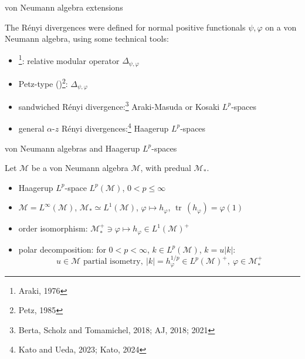 \documentclass[mathserif]{beamer}
\newcommand{\<}{\langle}
\renewcommand{\>}{\rangle}
\newcommand{\Tr}{\operatorname{tr}\,}
\newcommand{\Me}{\mathcal M}
\begin{document}
\begin{frame}{von Neumann algebra extensions}

The R\'enyi divergences were defined for normal positive functionals $\psi,\varphi$ on a
von Neumann algebra, using some technical tools:

\medskip

\begin{itemize}
\item {}\footnote{Araki, 1976}:  relative modular operator
$\Delta_{\psi,\varphi}$
\item Petz-type ()\footnote{Petz, 1985}:
$\Delta_{\psi,\varphi}$
\item sandwiched R\'enyi divergence:\footnote{Berta, Scholz and Tomamichel,
2018; AJ, 2018; 2021}
 Araki-Masuda or Kosaki $L^p$-spaces
\item general $\alpha$-$z$ R\'enyi divergences:\footnote{Kato and Ueda, 2023; Kato, 2024}
Haagerup $L^p$-spaces

 \end{itemize}


\end{frame}

\begin{frame}{von Neumann algebras and Haagerup $L^p$-spaces}


Let $\Me$ be a  von Neumann algebra $\Me$, with predual $\Me_*$.

\bigskip 

\begin{itemize}


\item Haagerup $L^p$-space $L^p(\Me)$, $0<p\le \infty$

\medskip

\item $\Me=L^\infty(\Me)$, $\Me_*\simeq L^1(\Me)$, $\varphi\mapsto h_\varphi$,
$\Tr(h_\varphi)=\varphi(1)$

\medskip

\item order isomorphism: $\Me_*^+\ni \varphi\mapsto h_\varphi \in L^1(\Me)^+$


\medskip

\item polar decomposition: for $0<p<\infty$,  $k\in L^p(\Me)$, $k=u|k|$:
\[
u\in \Me \text{ partial isometry},\  |k|=h_\varphi^{1/p}\in L^p(\Me)^+,\ \varphi\in
\Me_*^+
\]

\end{itemize}
\end{frame}
\end{document}
